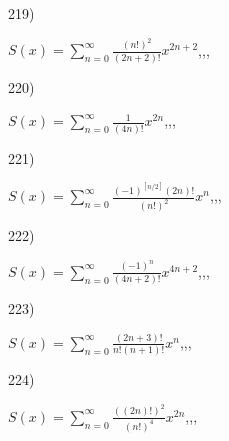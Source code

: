 \documentclass[11pt, ukrainian]{article}
\begin{document}
\par
\vspace{0.9cm}
219) \space 
{%
{$S(x)=\sum\limits_{n=0}^{\infty}{\frac{(n!)^2}{(2n+2)!}}{x^{{2n+2}}}$},,, \par \smallskip  
}
\par
\vspace{0.9cm}
220) \space 
{%
{$S(x)=\sum\limits_{n=0}^{\infty}{\frac{1}{(4n)!}}{x^{{2n}}}$},,, \par \smallskip  
}
\par
\newpage
221) \space 
{%
{$S(x)=\sum\limits_{n=0}^{\infty}{\frac{{(-1)^{[n/2]}}(2n)!}{(n!)^2}}{x^{n}}$},,, \par \smallskip  
}
\par
\vspace{0.9cm}
222) \space 
{%
{$S(x)=\sum\limits_{n=0}^{\infty}{\frac{(-1)^n}{(4n+2)!}}{x^{{4n+2}}}$},,, \par \smallskip  
}
\par
\vspace{0.9cm}
223) \space 
{%
{$S(x)=\sum\limits_{n=0}^{\infty}{\frac{(2n+3)!}{n!(n+1)!}}{x^{n}}$},,, \par \smallskip  
}
\par
\vspace{0.9cm}
224) \space 
{%
{$S(x)=\sum\limits_{n=0}^{\infty}{\frac{((2n)!)^2}{(n!)^4}}{x^{{2n}}}$},,, \par \smallskip  
}
\end{document}
